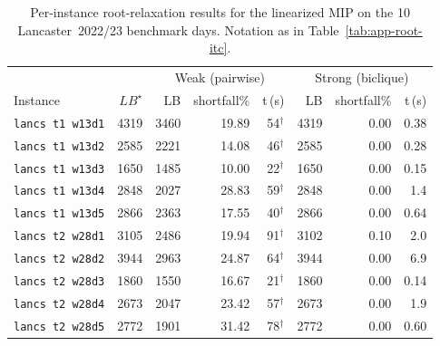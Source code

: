 \documentclass[11pt]{article}
\begin{document}
\begin{table}[ht]
\centering
\scriptsize
\setlength{\tabcolsep}{4pt}
\begin{tabular}{@{}lr rrr rrr@{}}
\hline
 & & \multicolumn{3}{c}{Weak (pairwise)} & \multicolumn{3}{c}{Strong (biclique)} \\
Instance & $LB^\star$ & LB & shortfall\% & t\,(s) & LB & shortfall\% & t\,(s) \\
\hline
\texttt{lancs t1 w13d1} & 4319 & 3460 & 19.89 & 54$^\dagger$ & 4319 & 0.00 & 0.38 \\
\texttt{lancs t1 w13d2} & 2585 & 2221 & 14.08 & 46$^\dagger$ & 2585 & 0.00 & 0.28 \\
\texttt{lancs t1 w13d3} & 1650 & 1485 & 10.00 & 22$^\dagger$ & 1650 & 0.00 & 0.15 \\
\texttt{lancs t1 w13d4} & 2848 & 2027 & 28.83 & 59$^\dagger$ & 2848 & 0.00 & 1.4 \\
\texttt{lancs t1 w13d5} & 2866 & 2363 & 17.55 & 40$^\dagger$ & 2866 & 0.00 & 0.64 \\
\texttt{lancs t2 w28d1} & 3105 & 2486 & 19.94 & 91$^\dagger$ & 3102 & 0.10 & 2.0 \\
\texttt{lancs t2 w28d2} & 3944 & 2963 & 24.87 & 64$^\dagger$ & 3944 & 0.00 & 6.9 \\
\texttt{lancs t2 w28d3} & 1860 & 1550 & 16.67 & 21$^\dagger$ & 1860 & 0.00 & 0.14 \\
\texttt{lancs t2 w28d4} & 2673 & 2047 & 23.42 & 57$^\dagger$ & 2673 & 0.00 & 1.9 \\
\texttt{lancs t2 w28d5} & 2772 & 1901 & 31.42 & 78$^\dagger$ & 2772 & 0.00 & 0.60 \\
\hline
\end{tabular}
\caption{Per-instance root-relaxation results for the linearized MIP on the 10
Lancaster~2022/23 benchmark days. Notation as in
Table~\ref{tab:app-root-itc}.}
\label{tab:app-root-lan}
\end{table}
\end{document}
